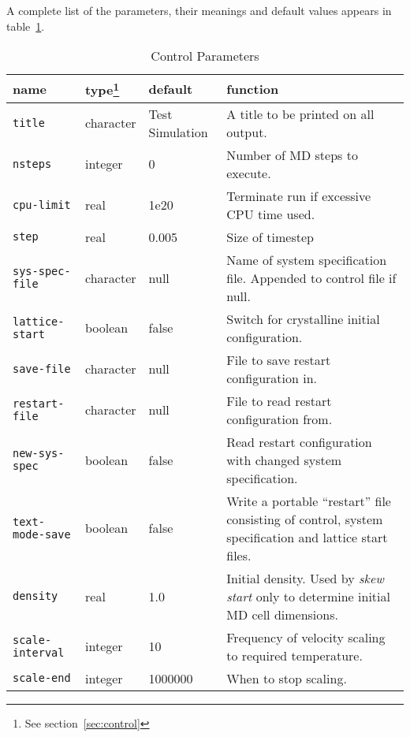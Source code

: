 A complete list of the parameters,
their meanings and default values appears in
table~\ref{tab:parameters}. 

\begin{table}
\begin{minipage}{\textwidth}
\caption{Control Parameters}
\label{tab:parameters}
\begin{tabular}{|l|l|l|p{2.7in}|}
\hline
{\bf name} & {\bf type}\footnote{See section~\ref{sec:control}} &
{\bf default} & {\bf function} \\ \hline \hline
\verb'title' &                  character  & {\small Test Simulation} &
A title to be printed on all output. \\
\verb'nsteps' &                 integer &                       0 &
Number of MD steps to execute. \\
\verb'cpu-limit' &              real &                  1e20 &
Terminate run if excessive CPU time used. \\
\verb'step' &                   real &                  0.005 &
Size of timestep \\ \hline
\verb'sys-spec-file' &          character  &    null &
Name of system specification file.  Appended to control file if null. \\
\verb'lattice-start' &          boolean &               false  &
Switch for crystalline initial configuration. \\
\verb'save-file' &              character  &    null &
File to save restart configuration in. \\
\verb'restart-file' &           character  &    null &
File to read restart configuration from. \\
\verb'new-sys-spec' &           boolean &               false  &
Read restart configuration with changed system specification. \\
\verb'text-mode-save' &         boolean &               false &
Write a portable ``restart'' file consisting of control, system
specification and lattice start files. \\ \hline
\verb'density' &                real &                  1.0 &
Initial density.  Used by {\em skew start\/} only to determine initial
MD cell dimensions. \\ \hline
\verb'scale-interval' &         integer &               10 &
Frequency of velocity scaling to required temperature. \\
\verb'scale-end' &              integer &                       1000000 &
When to stop scaling. \\

\end{tabular}
\end{minipage}
\end{table}
